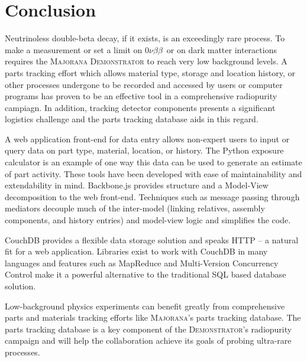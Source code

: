 \documentclass[journal]{IEEEtran}
\def\znbb{0$\nu\beta\beta$}
\begin{document}
\section{Conclusion}

Neutrinoless double-beta decay, if it exists, is an exceedingly rare process.
To make a measurement or set a limit on \znbb\ or on dark matter interactions 
requires the \textsc{Majorana Demonstrator} to reach very low background levels. A parts tracking effort which allows material type,
storage and location history, or other processes undergone to be recorded and
accessed by users or computer programs has proven to be an effective tool in a comprehensive
radiopurity campiagn. In addition, tracking detector components presents a significant
logistics challenge and the parts tracking database aids in this regard.

A web application front-end for data entry allows non-expert users to input
or query data on part type, material, location, or history. The Python exposure
calculator is an example of one way this data can be used to generate an estimate
of part activity. These tools have been developed with ease of maintainability and
extendability in mind. Backbone.js provides structure and a Model-View
decomposition to the web front-end. Techniques such as message passing through mediators
decouple much of the inter-model (linking relatives, assembly components, and history entries)
and model-view logic and simplifies the code.

CouchDB provides a flexible data storage solution and speaks HTTP -- a natural
fit for a web application. Libraries exist to work with CouchDB in many languages and
features such as MapReduce and Multi-Version Concurrency Control make it a powerful
alternative to the traditional SQL based database solution.

Low-background physics experiments can benefit greatly from comprehensive
parts and materials tracking efforts like \textsc{Majorana}'s parts tracking database.
The parts tracking database is a 
key component of the \textsc{Demonstrator}'s radiopurity campaign and will help the collaboration achieve
its goals of probing ultra-rare processes.

%
%
\end{document}
